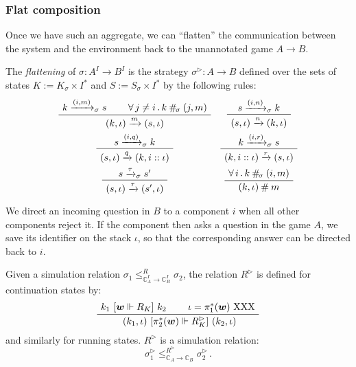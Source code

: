 {\subsubsection{Flat composition} %

Once we have such an aggregate,
we can ``flatten'' the communication between
the system and the environment
back to the unannotated game $A \rightarrow B$.

\begin{definition} %
The \emph{flattening} of $\sigma : A^I \rightarrow B^I$
is the strategy $\sigma^\rhd : A \rightarrow B$
defined over the sets of states
$K := K_\sigma \times I^*$ and
$S := S_\sigma \times I^*$ by the following rules:
\[
  \begin{array}{c@{\quad}c}
    \AxiomC{$k \xrightarrow{(i, m)}_\sigma s$}
    \AxiomC{$\forall \, j \ne i \,.\, k \: \#_{\!\sigma} \: (j, m)$}
    \BinaryInfC{$(k, \iota) \xrightarrow{m} (s, \iota)$}
    \DisplayProof
    &
    \AxiomC{$s \xrightarrow{(i, n)}_\sigma k$}
    \UnaryInfC{$(s, \iota) \xrightarrow{n} (k, \iota)$}
    \DisplayProof
    \\[1.5em]
    \AxiomC{$s \xrightarrow{(i, q)}_\sigma k$}
    \UnaryInfC{$(s, \iota) \xrightarrow{q} (k, i :: \iota)$}
    \DisplayProof
    &
    \AxiomC{$k \xrightarrow{(i, r)}_\sigma s$}
    \UnaryInfC{$(k, i :: \iota) \xrightarrow{r} (s, \iota)$}
    \DisplayProof
    \\[1.5em]
    \AxiomC{$s \xrightarrow{\tau}_\sigma s'$}
    \UnaryInfC{$(s, \iota) \xrightarrow{\tau} (s', \iota)$}
    \DisplayProof
    &
    \AxiomC{$\forall \,i\,.\, k \: \#_{\!\sigma} \: (i, m)$}
    \UnaryInfC{$(k, \iota) \:\#\: m$}
    \DisplayProof
  \end{array}
\]
\end{definition}

We direct an incoming question in $B$
to a component $i$ when all other components reject it.
If the component then asks a question in the game $A$,
we save its identifier on the stack $\iota$,
so that the corresponding answer can be directed back to $i$.

\begin{lemma}
Given a simulation relation
$\sigma_1 \le_{\mathbb{C}_A^I \rightarrow \mathbb{C}_B^I}^R \sigma_2$,
the relation $R^\rhd$ is defined for continuation states by:
\[
  \AxiomC{$k_1 \ifr{\vec{w} \Vdash R_K} k_2$}
  \AxiomC{$\iota = \pi_1^*(\vec{w}) \mbox{ XXX}$}
  \BinaryInfC{
    $(k_1, \iota) \ifr{\pi_2^*(\vec{w}) \Vdash R^\rhd_K} (k_2, \iota)$}
  \DisplayProof
\]
and similarly for running states.
$R^\rhd$ is a simulation relation:
\[
    \sigma_1^\rhd
    \le_{\mathbb{C}_A \rightarrow \mathbb{C}_B}^{R^\rhd}
    \sigma_2^\rhd \,.
\]
\end{lemma}

}
